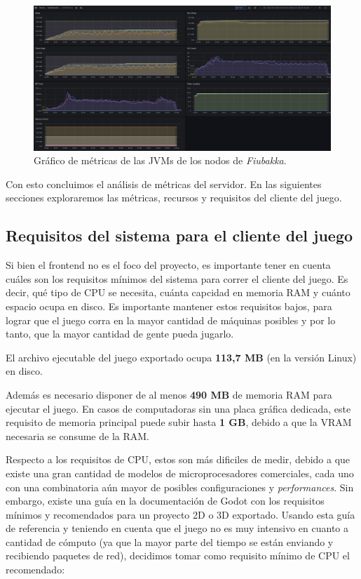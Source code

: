 \begin{figure}[htbp]
    \centering
    \includegraphics[width=1\textwidth]{../assets/jvm-metrics.png}
    \caption{Gráfico de métricas de las JVMs de los nodos de \textit{Fiubakka}.}
\end{figure}

\newpage

Con esto concluimos el análisis de métricas del servidor. En las siguientes secciones exploraremos las métricas, recursos y requisitos
del cliente del juego.

\subsection{Requisitos del sistema para el cliente del juego}

\noindent Si bien el frontend no es el foco del proyecto, es importante tener en cuenta cuáles son los 
requisitos mínimos del sistema para correr el cliente del juego. Es decir, qué tipo de CPU se necesita,
cuánta capcidad en memoria RAM y cuánto espacio ocupa en disco. Es importante mantener estos requisitos
bajos, para lograr que el juego corra en la mayor cantidad de máquinas posibles y por lo tanto,
que la mayor cantidad de gente pueda jugarlo.

El archivo ejecutable del juego exportado ocupa \textbf{113,7 MB} (en la versión Linux) en disco.

Además es necesario disponer de al menos \textbf{490 MB} de memoria RAM para ejecutar el juego.
En casos de computadoras sin una placa gráfica dedicada, este requisito de memoria principal puede subir
hasta \textbf{1 GB}, debido a que la VRAM necesaria se consume de la RAM.

Respecto a los requisitos de CPU, estos son más dificiles de medir, debido a que existe una gran cantidad
de modelos de microprocesadores comerciales, cada uno con una combinatoria aún mayor de posibles
configuraciones y \textit{performances}. Sin embargo, existe una guía en la documentación de Godot\cite{ref3}
con los requisitos mínimos y recomendados para un proyecto 2D o 3D exportado.
Usando esta guía de referencia y teniendo en cuenta que el juego no es muy intensivo en cuanto a cantidad
de cómputo (ya que la mayor parte del tiempo se están enviando y recibiendo paquetes de red), decidimos
tomar como requisito mínimo de CPU el recomendado:

